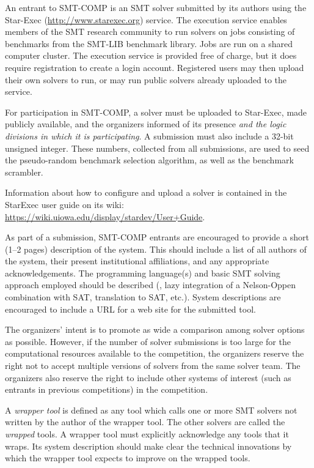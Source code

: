 \documentclass[12pt]{article}
\begin{document}
An entrant to SMT-COMP is an SMT solver
submitted by its authors using the Star-Exec (\url{http://www.starexec.org}) service.  
The execution service enables members of the
SMT research community to run solvers on jobs consisting of benchmarks
from the SMT-LIB benchmark library.  Jobs are run on a shared computer
cluster.  The execution service is provided free of
charge, but it does require registration to create a login account.  Registered users
may then upload their own solvers to run, or may run public solvers
already uploaded to the service.  


For participation in SMT-COMP, a solver must be
uploaded to Star-Exec, made publicly available, and the organizers informed of its presence {\em and the logic divisions in which it is participating}.
A submission must also include a 32-bit unsigned
integer.  These numbers, collected from all submissions, are used
to seed the pseudo-random benchmark selection algorithm, as well
as the benchmark scrambler.

Information about how to configure and upload a solver is contained in the StarExec user guide on its wiki:
\url{https://wiki.uiowa.edu/display/stardev/User+Guide}.

As part of a submission,
SMT-COMP entrants are encouraged to provide a short (1--2 pages) description of
the system.  This should include a list of all authors of the system,
 their present institutional affiliations, and any appropriate acknowledgements.  The programming
language(s) and basic SMT solving approach employed should be
described (\eg, lazy integration of a Nelson-Oppen combination with
SAT, translation to SAT, etc.).  System descriptions are encouraged to
include a URL for a web site for the submitted tool.  

The organizers' intent is to promote as wide a comparison among solver options as possible.
However, if the number of solver submissions is too large for the
computational resources available to the competition, the organizers reserve the right not to
accept multiple versions of solvers from the same solver team.  The organizers also reserve the right to
include other systems of interest (such as entrants in previous competitions) in the
competition.

A \emph{wrapper tool} is defined as any tool
which calls one or more SMT solvers not written by the author of the wrapper
tool.  The other solvers are called the \emph{wrapped} tools.  
A wrapper tool must explicitly acknowledge any tools that it wraps.
Its system description should make clear the technical innovations  by which the
wrapper tool expects to improve on the wrapped tools.
\end{document}
